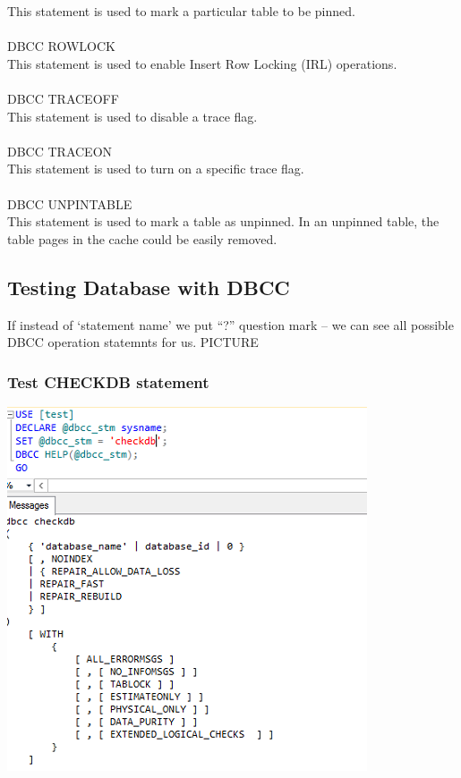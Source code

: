 \documentclass[english]{article}
\begin{document}
This statement is used to mark a particular table to be pinned. 
\\\\ 
DBCC ROWLOCK\\
This statement is used to enable Insert Row Locking (IRL) operations. 
\\\\ 
DBCC TRACEOFF\\
This statement is used to disable a trace flag. 
\\\\ 
DBCC TRACEON\\
This statement is used to turn on a specific trace flag. 
\\\\ 
DBCC UNPINTABLE\\
This statement is used to mark a table as unpinned. In an unpinned table, the table pages in the cache could be easily removed.
\subsection{Testing Database with DBCC}
If instead of ‘statement name’ we put “?” question mark – we can see all possible DBCC operation statemnts for us.
PICTURE
\subsubsection{Test CHECKDB statement}

\centerline{\includegraphics[scale=1]{administration/rep/16}}
\end{document}
